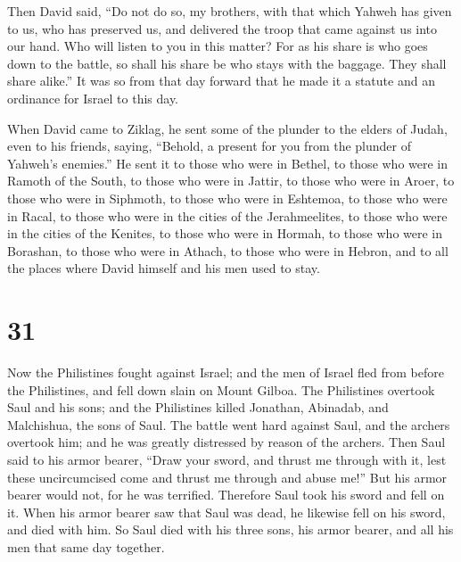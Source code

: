  Then David said, ``Do not do so, my brothers, with that
which Yahweh has given to us, who has preserved us, and delivered the
troop that came against us into our hand.  Who will
listen to you in this matter? For as his share is who goes down to the
battle, so shall his share be who stays with the baggage. They shall
share alike.''  It was so from that day forward that he
made it a statute and an ordinance for Israel to this day.

 When David came to Ziklag, he sent some of the plunder
to the elders of Judah, even to his friends, saying, ``Behold, a present
for you from the plunder of Yahweh's enemies.''  He sent
it to those who were in Bethel, to those who were in Ramoth of the
South, to those who were in Jattir,  to those who were in
Aroer, to those who were in Siphmoth, to those who were in Eshtemoa,
 to those who were in Racal, to those who were in the
cities of the Jerahmeelites, to those who were in the cities of the
Kenites,  to those who were in Hormah, to those who were
in Borashan, to those who were in Athach,  to those who
were in Hebron, and to all the places where David himself and his men
used to stay.

\hypertarget{section-30}{%
\section{31}\label{section-30}}

 Now the Philistines fought against Israel; and the men of
Israel fled from before the Philistines, and fell down slain on Mount
Gilboa.  The Philistines overtook Saul and his sons; and
the Philistines killed Jonathan, Abinadab, and Malchishua, the sons of
Saul.  The battle went hard against Saul, and the archers
overtook him; and he was greatly distressed by reason of the archers.
 Then Saul said to his armor bearer, ``Draw your sword,
and thrust me through with it, lest these uncircumcised come and thrust
me through and abuse me!'' But his armor bearer would not, for he was
terrified. Therefore Saul took his sword and fell on it. 
When his armor bearer saw that Saul was dead, he likewise fell on his
sword, and died with him.  So Saul died with his three
sons, his armor bearer, and all his men that same day together.


